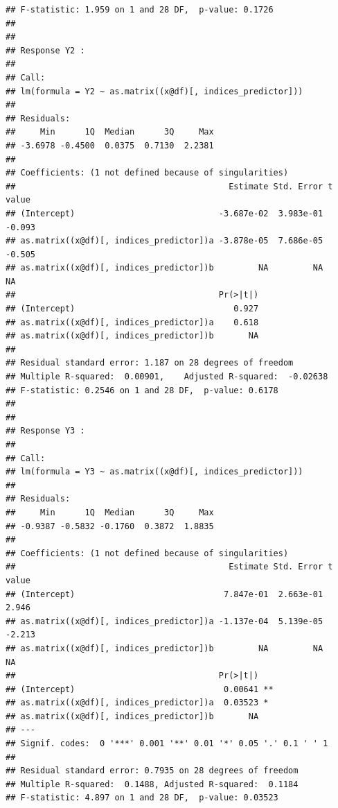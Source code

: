 \documentclass{article}\usepackage[]{graphicx}\usepackage[]{color}
\makeatletter
\newenvironment{kframe}{%
 \def\at@end@of@kframe{}%
 \ifinner\ifhmode%
  \def\at@end@of@kframe{\end{minipage}}%
  \begin{minipage}{\columnwidth}%
 \fi\fi%
 \def\FrameCommand##1{\hskip\@totalleftmargin \hskip-\fboxsep
 \colorbox{shadecolor}{##1}\hskip-\fboxsep
     \hskip-\linewidth \hskip-\@totalleftmargin \hskip\columnwidth}%
 \MakeFramed {\advance\hsize-\width
   \@totalleftmargin\z@ \linewidth\hsize
   \@setminipage}}%
 {\par\unskip\endMakeFramed%
 \at@end@of@kframe}
\newenvironment{knitrout}{}{} %
\makeatother
\begin{document}
\begin{knitrout}
\begin{kframe}
\begin{verbatim}
## F-statistic: 1.959 on 1 and 28 DF,  p-value: 0.1726
## 
## 
## Response Y2 :
## 
## Call:
## lm(formula = Y2 ~ as.matrix((x@df)[, indices_predictor]))
## 
## Residuals:
##     Min      1Q  Median      3Q     Max 
## -3.6978 -0.4500  0.0375  0.7130  2.2381 
## 
## Coefficients: (1 not defined because of singularities)
##                                           Estimate Std. Error t value
## (Intercept)                             -3.687e-02  3.983e-01  -0.093
## as.matrix((x@df)[, indices_predictor])a -3.878e-05  7.686e-05  -0.505
## as.matrix((x@df)[, indices_predictor])b         NA         NA      NA
##                                         Pr(>|t|)
## (Intercept)                                0.927
## as.matrix((x@df)[, indices_predictor])a    0.618
## as.matrix((x@df)[, indices_predictor])b       NA
## 
## Residual standard error: 1.187 on 28 degrees of freedom
## Multiple R-squared:  0.00901,	Adjusted R-squared:  -0.02638 
## F-statistic: 0.2546 on 1 and 28 DF,  p-value: 0.6178
## 
## 
## Response Y3 :
## 
## Call:
## lm(formula = Y3 ~ as.matrix((x@df)[, indices_predictor]))
## 
## Residuals:
##     Min      1Q  Median      3Q     Max 
## -0.9387 -0.5832 -0.1760  0.3872  1.8835 
## 
## Coefficients: (1 not defined because of singularities)
##                                           Estimate Std. Error t value
## (Intercept)                              7.847e-01  2.663e-01   2.946
## as.matrix((x@df)[, indices_predictor])a -1.137e-04  5.139e-05  -2.213
## as.matrix((x@df)[, indices_predictor])b         NA         NA      NA
##                                         Pr(>|t|)   
## (Intercept)                              0.00641 **
## as.matrix((x@df)[, indices_predictor])a  0.03523 * 
## as.matrix((x@df)[, indices_predictor])b       NA   
## ---
## Signif. codes:  0 '***' 0.001 '**' 0.01 '*' 0.05 '.' 0.1 ' ' 1
## 
## Residual standard error: 0.7935 on 28 degrees of freedom
## Multiple R-squared:  0.1488,	Adjusted R-squared:  0.1184 
## F-statistic: 4.897 on 1 and 28 DF,  p-value: 0.03523
\end{verbatim}
\end{kframe}
\end{knitrout}
\end{document}
